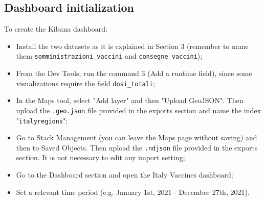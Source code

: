 \documentclass{article}
\begin{document}
\subsection{Dashboard initialization}
To create the Kibana dashboard:
\begin{itemize}
    \item Install the two datasets as it is explained in Section 3 (remember to name them   \verb|somministrazioni_vaccini| and \verb|consegne_vaccini|);
    \item From the Dev Tools, run the command 3 (Add a runtime field), since some visualizations require the field \verb|dosi_totali|;
    \item In the Maps tool, select "Add layer" and then "Upload GeoJSON". Then upload the \verb|.geo.json| file provided in the exports section and name the index "\verb|italyregions|"; 
    \item Go to Stack Management (you can leave the Maps page without saving) and then to Saved Objects. Then upload the \verb|.ndjson| file provided in the exports section. It is not necessary to edit any import setting;
    \item Go to the Dashboard section and open the Italy Vaccines dashboard;
    \item Set a relevant time period (e.g. January 1st, 2021 - December 27th, 2021).
\end{itemize}
\end{document}

